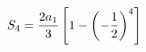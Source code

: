 \documentclass[preview]{standalone}
\begin{document}
\begin{align*}
\special{dvisvgm:raw <g id='unique000'>}S_4=\frac{2a_1}{3}\left[1-\left(-\frac{1}{2}\right)^4\right]\special{dvisvgm:raw </g>}
\end{align*}
\end{document}
